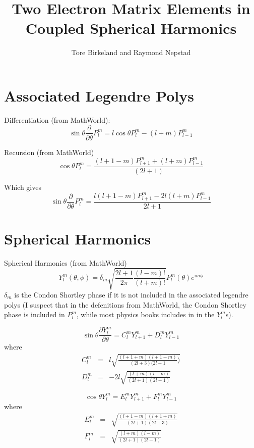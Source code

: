 \documentclass[a4paper,12pt]{paper}
\title{Two Electron Matrix Elements in Coupled Spherical Harmonics}
\author{Tore Birkeland and Raymond Nepstad}
\renewcommand{\imath}{{\mathrm i}}
\newcommand{\partialdiff}[2]{\frac{\partial #1}{\partial #2}}
\begin{document}
\section{Associated Legendre Polys}

Differentiation (from MathWorld):
\begin{equation}
	\sin \theta \partialdiff{}{\theta} P_l^m = l \cos \theta P_l^m - (l+m)
P_{l-1}^m
\end{equation}

Recursion (from MathWorld)
\begin{equation}
	\cos \theta P_l^m = \frac{ (l+1-m) P_{l+1}^m + (l+m) P_{l-1}^m }{ (2 l +
1) }
\end{equation}

Which gives
\begin{equation}
	\sin \theta \partialdiff{}{\theta} P_l^m = \frac{l(l+1-m) P_{l+1}^m 
- 2l(l+m) P_{l-1}^m}{2l + 1} 
\end{equation}


\section{Spherical Harmonics}

Spherical Harmonics (from MathWorld)
\begin{equation}
	\label{eqn:spherical-harmonics}
	Y_l^m(\theta, \phi) = \delta_m \sqrt{ \frac{2l + 1}{2 \pi}
\frac{(l-m)!}{(l+m)!} } P_l^m(\theta) e^{\imath m \phi}
\end{equation}
$\delta_m$ is the Condon Shortley phase if it is not included in the associated
legendre polys (I suspect that in the defenitions from MathWorld, the Condon
Shortley phase is included in $P_l^m$, while most physics books includes in in
the $Y_l^m$s).

\begin{equation}
	\sin \theta \partialdiff{Y_l^m}{\theta} = C_l^m Y_{l+1}^m
+ D_l^m Y_{l-1}^m
\end{equation}
where
\begin{eqnarray}
	C_l^m &=& l \sqrt{ \frac{(l+1+m)(l+1-m)}{(2l + 3)(2l +1})} \\
	D_l^m &=& - 2 l \sqrt{ \frac{(l+m)(l-m)}{(2l + 1)(2l - 1)} }
\end{eqnarray}

\begin{equation}
 	\cos \theta Y_l^m = E_l^m Y_{l+1}^m + F_l^m Y_{l-1}^m
\end{equation}
where
\begin{eqnarray}
	E_l^m &=& \sqrt{ \frac{(l+1-m)(l+1+m)}{(2l+1)(2l+3)} } \\
	F_l^m &=& \sqrt{ \frac{(l+m)(l-m)}{(2l+1)(2l-1)} }
\end{eqnarray}
\end{document}
